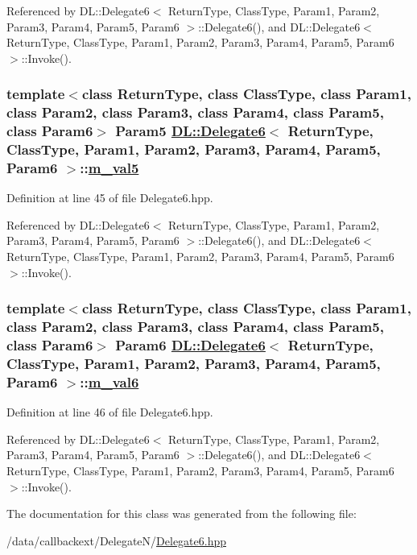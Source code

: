 Referenced by DL::Delegate6$<$ Return\-Type, Class\-Type, Param1, Param2, Param3, Param4, Param5, Param6 $>$::Delegate6(), and DL::Delegate6$<$ Return\-Type, Class\-Type, Param1, Param2, Param3, Param4, Param5, Param6 $>$::Invoke().\hypertarget{classDL_1_1Delegate6_r6}{
\subsubsection[m\_\-val5]{\setlength{\rightskip}{0pt plus 5cm}template$<$class Return\-Type, class Class\-Type, class Param1, class Param2, class Param3, class Param4, class Param5, class Param6$>$ Param5 \hyperlink{classDL_1_1Delegate6}{DL::Delegate6}$<$ Return\-Type, Class\-Type, Param1, Param2, Param3, Param4, Param5, Param6 $>$::\hyperlink{classDL_1_1Delegate6_r6}{m\_\-val5}}}
\label{classDL_1_1Delegate6_r6}




Definition at line 45 of file Delegate6.hpp.

Referenced by DL::Delegate6$<$ Return\-Type, Class\-Type, Param1, Param2, Param3, Param4, Param5, Param6 $>$::Delegate6(), and DL::Delegate6$<$ Return\-Type, Class\-Type, Param1, Param2, Param3, Param4, Param5, Param6 $>$::Invoke().\hypertarget{classDL_1_1Delegate6_r7}{
\subsubsection[m\_\-val6]{\setlength{\rightskip}{0pt plus 5cm}template$<$class Return\-Type, class Class\-Type, class Param1, class Param2, class Param3, class Param4, class Param5, class Param6$>$ Param6 \hyperlink{classDL_1_1Delegate6}{DL::Delegate6}$<$ Return\-Type, Class\-Type, Param1, Param2, Param3, Param4, Param5, Param6 $>$::\hyperlink{classDL_1_1Delegate6_r7}{m\_\-val6}}}
\label{classDL_1_1Delegate6_r7}




Definition at line 46 of file Delegate6.hpp.

Referenced by DL::Delegate6$<$ Return\-Type, Class\-Type, Param1, Param2, Param3, Param4, Param5, Param6 $>$::Delegate6(), and DL::Delegate6$<$ Return\-Type, Class\-Type, Param1, Param2, Param3, Param4, Param5, Param6 $>$::Invoke().

The documentation for this class was generated from the following file:\begin{CompactItemize}
\item 
/data/callbackext/Delegate\-N/\hyperlink{Delegate6_8hpp}{Delegate6.hpp}\end{CompactItemize}
